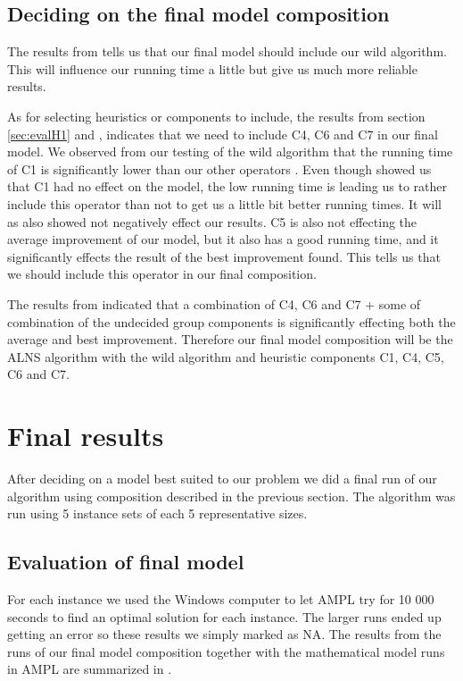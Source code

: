 \documentclass[../main.tex]{subfiles}
\begin{document}
\subsection{Deciding on the final model composition}
\label{sec:iniObs}
The results from  tells us that our final model should include our wild algorithm. 
This will influence our running time a little but give us much more reliable results.
\par
As for selecting heuristics or components to include, the results from section \ref{sec:evalH1} and , indicates that we need to include C4, C6 and C7 in our final model.
We observed from our testing of the wild algorithm that the running time of C1 is significantly lower than our other operators . Even though  showed us that C1 had no effect on the model, the low running time is leading us to rather include this operator than not to get us a little bit better running times.
It will as  also showed not negatively effect our results.
C5 is also not effecting the average improvement of our model, but it also has a good running time, and it significantly effects the result of the best improvement found. This tells us that we should include this operator in our final composition. \par
The results from  indicated that a combination of C4, C6 and C7 + some of combination of the undecided group components is significantly effecting both the average and best improvement. Therefore our final model composition will be the ALNS algorithm with the wild algorithm and heuristic components C1, C4, C5, C6 and C7.

\section{Final results}
\label{sec:finRes}
After deciding on a model best suited to our problem we did a final run of our algorithm using composition described in the previous section.
The algorithm was run using 5 instance sets of each 5 representative sizes. 
\subsection{Evaluation of final model}
\label{sec:finRes}
For each instance we used the Windows computer to let AMPL try for 10 000 seconds to find an optimal solution for each instance. 
The larger runs ended up getting an error so these results we simply marked as NA.
The results from the runs of our final model composition together with the mathematical model runs in AMPL are summarized in . 
\end{document}
